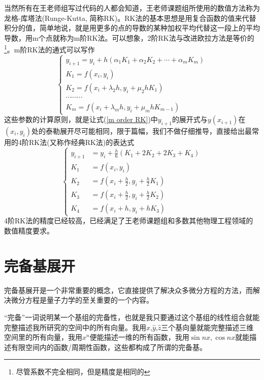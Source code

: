 \documentclass[12pt,a4paper,openany,twoside]{book}
\numberwithin{equation}{section}
\begin{document}
      当然所有在王老师组写过代码的人都会知道，王老师课题组所使用的数值方法称为龙格-库塔法(Runge-Kutta, 简称RK)。RK法的基本思想是用复合函数的值来代替积分的值，简单地说，就是用更多的点的导数的某种加权平均代替这一段上的平均导数，用m个点就称为m阶RK法。可以想象，2阶RK法与改进欧拉方法是等价的\footnote{尽管系数不完全相同，但是精度是相同的}。m阶RK法的通式可以写作
      \begin{equation}
        \left\{\begin{array}{l}{y_{i+1}=y_{i}+h\left(\alpha_{1} K_{1}+\alpha_{2} K_{2}+\cdots+\alpha_{m} K_{m}\right)} \\ {K_{1}=f\left(x_{i}, y_{i}\right)} \\ {K_{2}=f\left(x_{i}+\lambda_{2} h, y_{i}+\mu_{2} h K_{1}\right)} \\{\cdots \cdots \cdots }\\ {K_{m}=f\left(x_{i}+\lambda_{m} h, y_{i}+\mu_{m} h K_{m-1}\right)}\end{array}\right.
        \label{m order RK}
      \end{equation}
      这些参数的计算原则，就是让式(\ref{m order RK})中$y_{i+1}$的展开式与$y(x_{i+1})$在$(x_i,y_i)$处的泰勒展开尽可能相同，限于篇幅，我们不做仔细推导，直接给出最常用的4阶RK法(又称作经典RK法)的表达式
      \begin{equation}
        \left\{\begin{aligned} y_{i+1} &=y_{i}+\frac{h}{6}\left(K_{1}+2 K_{2}+2 K_{3}+K_{4}\right) \\ K_{1} &=f\left(x_{i}, y_{i}\right) \\ K_{2} &=f\left(x_{i}+\frac{h}{2}, y_{i}+\frac{h}{2} K_{1}\right) \\ K_{3} &=f\left(x_{i}+\frac{h}{2}, y_{i}+\frac{h}{2} K_{2}\right) \\ K_{4} &=f\left(x_{i}+h, y_{i}+h K_{3}\right) \end{aligned}\right.
        \label{4 order RK}
      \end{equation}
      4阶RK法的精度已经较高，已经满足了王老师课题组和多数其他物理工程领域的数值精度要求。
    \section{完备基展开}
    完备基展开是一个非常重要的概念，它直接提供了解决众多微分方程的方法，而解决微分方程是量子力学的至关重要的一个内容。

    ``完备''一词说明某一个基组的完备性，也就是我只要通过这个基组的线性组合就能完整描述我所研究的空间中的所有向量。我用$\hat{x}$,$\hat{y}$,$\hat{z}$三个基向量就能完整描述三维空间里的所有向量，我用${x^n}$便能描述一维的所有函数，我用${\sin{nx},\cos{nx}}$就能描述有限空间内的函数/周期性函数，这些都构成了所谓的完备基。
\end{document}
